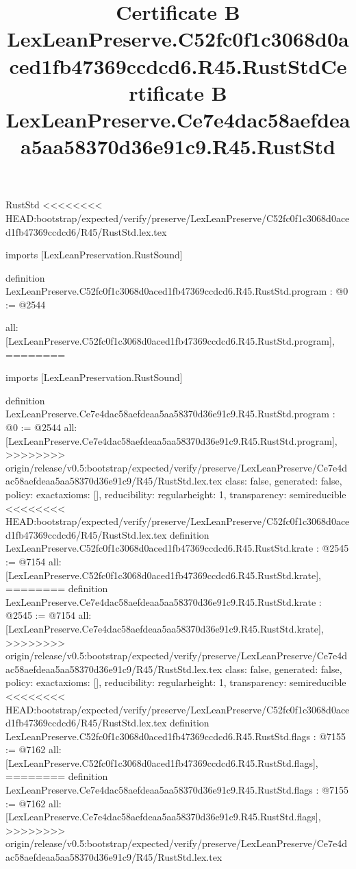 \begin{lexlean}{RustStd}
<<<<<<<< HEAD:bootstrap/expected/verify/preserve/LexLeanPreserve/C52fc0f1c3068d0aced1fb47369ccdcd6/R45/RustStd.lex.tex
\title{Certificate B LexLeanPreserve.C52fc0f1c3068d0aced1fb47369ccdcd6.R45.RustStd}
\begin{coremodule}
imports [LexLeanPreservation.RustSound]

definition LexLeanPreserve.C52fc0f1c3068d0aced1fb47369ccdcd6.R45.RustStd.program : @0 := @2544 {
  all: [LexLeanPreserve.C52fc0f1c3068d0aced1fb47369ccdcd6.R45.RustStd.program],
========
\title{Certificate B LexLeanPreserve.Ce7e4dac58aefdeaa5aa58370d36e91c9.R45.RustStd}
\begin{coremodule}
imports [LexLeanPreservation.RustSound]

definition LexLeanPreserve.Ce7e4dac58aefdeaa5aa58370d36e91c9.R45.RustStd.program : @0 := @2544 {
  all: [LexLeanPreserve.Ce7e4dac58aefdeaa5aa58370d36e91c9.R45.RustStd.program],
>>>>>>>> origin/release/v0.5:bootstrap/expected/verify/preserve/LexLeanPreserve/Ce7e4dac58aefdeaa5aa58370d36e91c9/R45/RustStd.lex.tex
  class: false,
  generated: false,
  policy: exact{axioms: []},
  reducibility: regular{height: 1},
  transparency: semireducible
}
<<<<<<<< HEAD:bootstrap/expected/verify/preserve/LexLeanPreserve/C52fc0f1c3068d0aced1fb47369ccdcd6/R45/RustStd.lex.tex
definition LexLeanPreserve.C52fc0f1c3068d0aced1fb47369ccdcd6.R45.RustStd.krate : @2545 := @7154 {
  all: [LexLeanPreserve.C52fc0f1c3068d0aced1fb47369ccdcd6.R45.RustStd.krate],
========
definition LexLeanPreserve.Ce7e4dac58aefdeaa5aa58370d36e91c9.R45.RustStd.krate : @2545 := @7154 {
  all: [LexLeanPreserve.Ce7e4dac58aefdeaa5aa58370d36e91c9.R45.RustStd.krate],
>>>>>>>> origin/release/v0.5:bootstrap/expected/verify/preserve/LexLeanPreserve/Ce7e4dac58aefdeaa5aa58370d36e91c9/R45/RustStd.lex.tex
  class: false,
  generated: false,
  policy: exact{axioms: []},
  reducibility: regular{height: 1},
  transparency: semireducible
}
<<<<<<<< HEAD:bootstrap/expected/verify/preserve/LexLeanPreserve/C52fc0f1c3068d0aced1fb47369ccdcd6/R45/RustStd.lex.tex
definition LexLeanPreserve.C52fc0f1c3068d0aced1fb47369ccdcd6.R45.RustStd.flags : @7155 := @7162 {
  all: [LexLeanPreserve.C52fc0f1c3068d0aced1fb47369ccdcd6.R45.RustStd.flags],
========
definition LexLeanPreserve.Ce7e4dac58aefdeaa5aa58370d36e91c9.R45.RustStd.flags : @7155 := @7162 {
  all: [LexLeanPreserve.Ce7e4dac58aefdeaa5aa58370d36e91c9.R45.RustStd.flags],
>>>>>>>> origin/release/v0.5:bootstrap/expected/verify/preserve/LexLeanPreserve/Ce7e4dac58aefdeaa5aa58370d36e91c9/R45/RustStd.lex.tex
}}}
\end{coremodule}}
\end{coremodule}
\end{lexlean}

